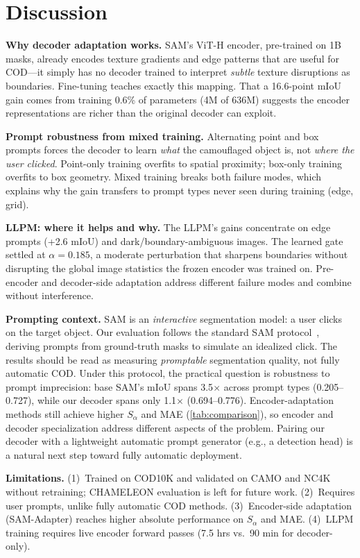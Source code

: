 \section{Discussion}

\noindent\textbf{Why decoder adaptation works.}
SAM's ViT-H encoder, pre-trained on 1B masks, already encodes texture gradients and edge patterns that are useful for COD---it simply has no decoder trained to interpret \emph{subtle} texture disruptions as boundaries. Fine-tuning teaches exactly this mapping. That a 16.6-point mIoU gain comes from training 0.6\% of parameters (4M of 636M) suggests the encoder representations are richer than the original decoder can exploit.

\noindent\textbf{Prompt robustness from mixed training.}
Alternating point and box prompts forces the decoder to learn \emph{what} the camouflaged object is, not \emph{where the user clicked}. Point-only training overfits to spatial proximity; box-only training overfits to box geometry. Mixed training breaks both failure modes, which explains why the gain transfers to prompt types never seen during training (edge, grid).

\noindent\textbf{LLPM: where it helps and why.}
The LLPM's gains concentrate on edge prompts (+2.6 mIoU) and dark/boundary-ambiguous images. The learned gate settled at $\alpha = 0.185$, a moderate perturbation that sharpens boundaries without disrupting the global image statistics the frozen encoder was trained on. Pre-encoder and decoder-side adaptation address different failure modes and combine without interference.

\noindent\textbf{Prompting context.}
SAM is an \emph{interactive} segmentation model: a user clicks on the target object. Our evaluation follows the standard SAM protocol~\cite{kirillov2023sam}, deriving prompts from ground-truth masks to simulate an idealized click. The results should be read as measuring \emph{promptable} segmentation quality, not fully automatic COD. Under this protocol, the practical question is robustness to prompt imprecision: base SAM's mIoU spans 3.5$\times$ across prompt types (0.205--0.727), while our decoder spans only 1.1$\times$ (0.694--0.776). Encoder-adaptation methods still achieve higher $S_\alpha$ and MAE (\cref{tab:comparison}), so encoder and decoder specialization address different aspects of the problem. Pairing our decoder with a lightweight automatic prompt generator (e.g., a detection head) is a natural next step toward fully automatic deployment.

\noindent\textbf{Limitations.}
(1)~Trained on COD10K and validated on CAMO and NC4K without retraining; CHAMELEON evaluation is left for future work. (2)~Requires user prompts, unlike fully automatic COD methods. (3)~Encoder-side adaptation (SAM-Adapter) reaches higher absolute performance on $S_\alpha$ and MAE. (4)~LLPM training requires live encoder forward passes (7.5 hrs vs.\ 90 min for decoder-only).
